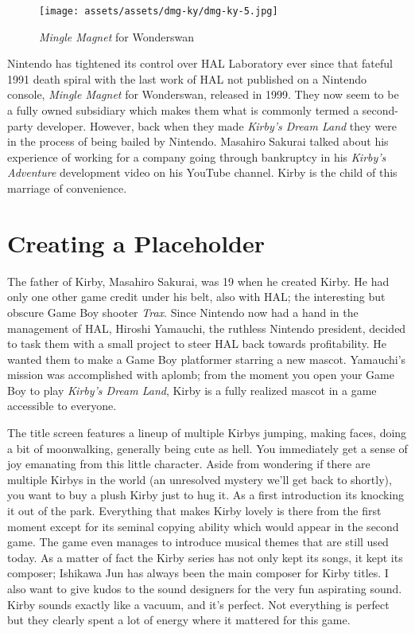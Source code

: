 \documentclass{book}
\begin{document}
\begin{figure}[hbt]
\vskip 10pt
\centering \texttt{[image: assets/assets/dmg-ky/dmg-ky-5.jpg]}\par\pagetwodescription \emph{Mingle Magnet} for Wonderswan
\vskip 6pt
\end{figure}

Nintendo has tightened its control over HAL Laboratory ever since that fateful 1991 death spiral with the last work of HAL not published on a Nintendo console, \emph{Mingle Magnet} for Wonderswan, released in 1999. They now seem to be a fully owned subsidiary which makes them what is commonly termed a second-party developer. However, back when they made \emph{Kirby’s Dream Land} they were in the process of being bailed by Nintendo. Masahiro Sakurai talked about his experience of working for a company going through bankruptcy in his \emph{Kirby’s Adventure} development video on his YouTube channel. Kirby is the child of this marriage of convenience.

\FloatBarrier\needspace{10mm}\section*{Creating a Placeholder}\nopagebreak[4]

The father of Kirby, Masahiro Sakurai, was 19 when he created Kirby. He had only one other game credit under his belt, also with HAL; the interesting but obscure Game Boy shooter \emph{Trax}. Since Nintendo now had a hand in the management of HAL, Hiroshi Yamauchi, the ruthless Nintendo president, decided to task them with a small project to steer HAL back towards profitability. He wanted them to make a Game Boy platformer starring a new mascot. Yamauchi’s mission was accomplished with aplomb; from the moment you open your Game Boy to play \emph{Kirby’s Dream Land}, Kirby is a fully realized mascot in a game accessible to everyone.

The title screen features a lineup of multiple Kirbys jumping, making faces, doing a bit of moonwalking, generally being cute as hell. You immediately get a sense of joy emanating from this little character. Aside from wondering if there are multiple Kirbys in the world (an unresolved mystery we’ll get back to shortly), you want to buy a plush Kirby just to hug it. As a first introduction its knocking it out of the park. Everything that makes Kirby lovely is there from the first moment except for its seminal copying ability which would appear in the second game. The game even manages to introduce musical themes that are still used today. As a matter of fact the Kirby series has not only kept its songs, it kept its composer; Ishikawa Jun has always been the main composer for Kirby titles. I also want to give kudos to the sound designers for the very fun aspirating sound. Kirby sounds exactly like a vacuum, and it’s perfect. Not everything is perfect but they clearly spent a lot of energy where it mattered for this game.
\end{document}
